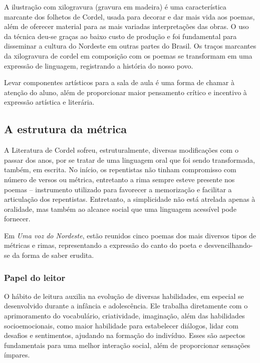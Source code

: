 \documentclass[12pt]{extarticle}
\begin{document}
A ilustração com xilogravura (gravura em madeira) é uma característica marcante
dos folhetos de Cordel, usada para decorar e dar mais vida aos poemas, além de
oferecer material para as mais variadas interpretações das obras. O uso da
técnica deu-se graças ao baixo custo de produção e foi fundamental para
disseminar a cultura do Nordeste em outras partes do Brasil. Os traços
marcantes da xilogravura de cordel em composição com os poemas se transformam
em uma expressão de linguagem, registrando a história do nosso povo.

Levar componentes artísticos para a sala de aula é uma forma de chamar
à atenção do aluno, além de proporcionar maior pensamento crítico e incentivo
à expressão artística e literária.


\subsection{A estrutura da métrica}

A Literatura de Cordel sofreu, estruturalmente, diversas modificações com
o passar dos anos, por se tratar de uma linguagem oral que foi sendo
transformada, também, em escrita. No início, os repentistas não tinham
compromisso com número de versos ou métrica, entretanto a rima sempre esteve
presente nos poemas -- instrumento utilizado para favorecer a memorização
e facilitar a articulação dos repentistas. Entretanto, a simplicidade não está
atrelada apenas à oralidade, mas também ao alcance social que uma linguagem
acessível pode fornecer.

Em \emph{Uma voz do Nordeste}, estão reunidos cinco poemas dos mais diversos
tipos de métricas e rimas, representando a expressão do canto do poeta
e desvencilhando-se da forma de saber erudita.

\subsubsection{Papel do leitor}

O hábito de leitura auxilia na evolução de diversas habilidades, em especial se
desenvolvido durante a infância e adolescência. Ele trabalha diretamente com
o aprimoramento do vocabulário, criatividade, imaginação, além das habilidades
socioemocionais, como maior habilidade para estabelecer diálogos, lidar com
desafios e sentimentos, ajudando na formação do indivíduo. Esses são aspectos
fundamentais para uma melhor interação social, além de proporcionar sensações
ímpares.
\end{document}
